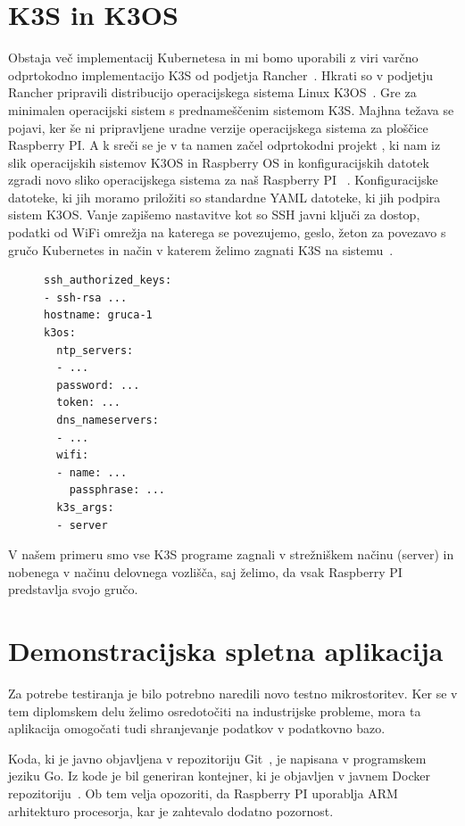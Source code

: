 \documentclass[a4paper, 12pt]{book}
\begin{document}
\section{K3S in K3OS}
Obstaja več implementacij Kubernetesa in mi bomo uporabili z viri varčno odprtokodno implementacijo K3S od podjetja Rancher~\cite{k3s-info}.
Hkrati so v podjetju Rancher pripravili distribucijo operacijskega sistema Linux K3OS~\cite{k3os-git}.
Gre za minimalen operacijski sistem s prednameščenim sistemom K3S.
Majhna težava se pojavi, ker še ni pripravljene uradne verzije operacijskega sistema za ploščice Raspberry PI.
A k sreči se je v ta namen začel odprtokodni projekt , ki nam iz slik operacijskih sistemov K3OS in Raspberry OS in konfiguracijskih datotek zgradi novo sliko operacijskega sistema za naš Raspberry PI ~\cite{k3os-rpi-image-generator}.
Konfiguracijske datoteke, ki jih moramo priložiti so standardne YAML datoteke, ki jih podpira sistem K3OS.
Vanje zapišemo nastavitve kot so SSH javni ključi za dostop, podatki od WiFi omrežja na katerega se povezujemo, geslo, žeton za povezavo s gručo Kubernetes in način v katerem želimo zagnati K3S na sistemu~\cite{k3os-git}.
\begin{figure}[h]
  \begin{verbatim}
ssh_authorized_keys:
- ssh-rsa ...
hostname: gruca-1
k3os:
  ntp_servers:
  - ...
  password: ...
  token: ...
  dns_nameservers:
  - ... 
  wifi:
  - name: ...
    passphrase: ...
  k3s_args:
  - server
\end{verbatim}
\end{figure}
V našem primeru smo vse K3S programe zagnali v strežniškem načinu (server) in nobenega v načinu delovnega vozlišča, saj želimo, da vsak Raspberry PI predstavlja svojo gručo.
\section{Demonstracijska spletna aplikacija}
Za potrebe testiranja je bilo potrebno naredili novo testno mikrostoritev.
Ker se v tem diplomskem delu želimo osredotočiti na industrijske probleme, mora ta aplikacija omogočati tudi shranjevanje podatkov v podatkovno bazo.

Koda, ki je javno objavljena v repozitoriju Git~\cite{git-stateful-rest-sample}, je napisana v programskem jeziku Go.
Iz kode je bil generiran kontejner, ki je objavljen v javnem Docker repozitoriju~\cite{docker-stateful-rest-sample}.
Ob tem velja opozoriti, da Raspberry PI uporablja ARM arhitekturo procesorja, kar je zahtevalo dodatno pozornost.
\end{document}
